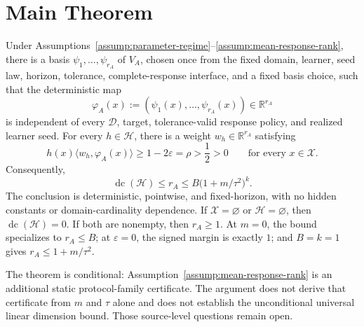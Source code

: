 \section{Main Theorem}

\begin{theorem}
\label{thm:main}
Under Assumptions~\ref{assump:parameter-regime}--\ref{assump:mean-response-rank},
there is a basis \(\psi_1,\ldots,\psi_{r_A}\) of \(V_A\), chosen once from
the fixed domain, learner, seed law, horizon, tolerance, complete-response
interface, and a fixed basis choice, such that the deterministic map
\[
\varphi_A(x):=(\psi_1(x),\ldots,\psi_{r_A}(x))
\in\mathbb R^{r_A}
\]
is independent of every \(\mathcal D\), target, tolerance-valid response
policy, and realized learner seed.  For every \(h\in\mathcal H\), there is a
weight \(w_h\in\mathbb R^{r_A}\) satisfying
\[
h(x)\langle w_h,\varphi_A(x)\rangle
\ge 1-2\varepsilon=\rho>\frac12>0
\qquad\text{for every }x\in\mathcal X.
\]
Consequently,
\[
\operatorname{dc}(\mathcal H)
\le r_A
\le B\bigl(1+m/\tau^2\bigr)^k.
\]
The conclusion is deterministic, pointwise, and fixed-horizon, with no hidden
constants or domain-cardinality dependence.  If \(\mathcal X=\varnothing\)
or \(\mathcal H=\varnothing\), then \(\operatorname{dc}(\mathcal H)=0\).
If both are nonempty, then \(r_A\ge1\).  At \(m=0\), the bound specializes
to \(r_A\le B\); at \(\varepsilon=0\), the signed margin is exactly \(1\);
and \(B=k=1\) gives \(r_A\le1+m/\tau^2\).
\end{theorem}

The theorem is conditional: Assumption~\ref{assump:mean-response-rank} is an
additional static protocol-family certificate.  The argument does not derive
that certificate from \(m\) and \(\tau\) alone and does not establish the
unconditional universal linear dimension bound.  Those source-level questions
remain open.
